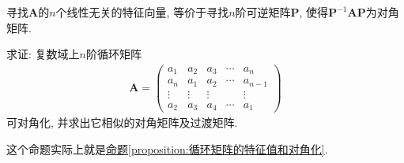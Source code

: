 \documentclass[../../main.tex]{subfiles}%
\begin{document}
寻找\(\boldsymbol{A}\)的\(n\)个线性无关的特征向量, 等价于寻找\(n\)阶可逆矩阵\(\boldsymbol{P}\), 使得\(\boldsymbol{P}^{-1}\boldsymbol{AP}\)为对角矩阵.

\begin{proposition}[循环矩阵一定可对角化]\label{proposition:循环矩阵一定可对角化}
求证: 复数域上\(n\)阶循环矩阵
\begin{align*}
\boldsymbol{A}=\begin{pmatrix}
a_{1}&a_{2}&a_{3}&\cdots&a_{n}\\
a_{n}&a_{1}&a_{2}&\cdots&a_{n - 1}\\
\vdots&\vdots&\vdots&&\vdots\\
a_{2}&a_{3}&a_{4}&\cdots&a_{1}
\end{pmatrix}
\end{align*}
可对角化, 并求出它相似的对角矩阵及过渡矩阵.
\end{proposition}
\begin{note}
这个命题实际上就是\hyperref[proposition:循环矩阵的特征值和对角化]{命题\ref{proposition:循环矩阵的特征值和对角化}}.
\end{note}
\end{document}
